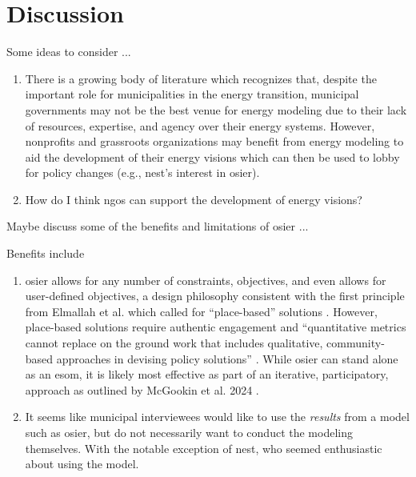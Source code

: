 \section{Discussion}

Some ideas to consider ...

\begin{enumerate}
    \item There is a growing body of literature which recognizes that, despite
    the important role for municipalities in the energy transition, municipal
    governments may not be the best venue for energy modeling due to their lack
    of resources, expertise, and agency over their energy systems. However,
    nonprofits and grassroots organizations may benefit from energy modeling to
    aid the development of their energy visions which can then be used to lobby
    for policy changes (e.g., \ac{nest}'s interest in \ac{osier}).
    \item How do I think \acp{ngo} can support the development of energy visions?
\end{enumerate}

Maybe discuss some of the benefits and limitations of \ac{osier} ...

Benefits include
\begin{enumerate}
    \item \ac{osier} allows for any number of constraints, objectives, and even
    allows for user-defined objectives, a design philosophy consistent with the
    first principle from Elmallah et al. which called for ``place-based''
    solutions \cite{elmallah_frontlining_2022}. However, place-based solutions
    require authentic engagement and ``quantitative metrics cannot replace on
    the ground work that includes qualitative, community-based approaches in
    devising policy solutions'' \cite{elmallah_frontlining_2022}. While
    \ac{osier} can stand alone as an \ac{esom}, it is likely most effective as
    part of an iterative, participatory, approach as outlined by McGookin et al.
    2024 \cite{mcgookin_advancing_2024}.
    \item It seems like municipal interviewees would like to use the \textit{results} from a model
    such as \ac{osier}, but do not necessarily want to conduct the modeling themselves. With the
    notable exception of \ac{nest}, who seemed enthusiastic about using the model.
\end{enumerate}